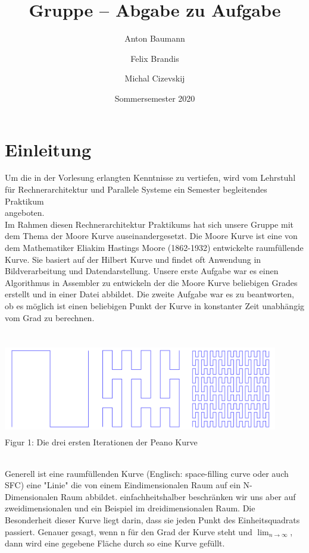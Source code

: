 \documentclass[course=erap]{aspdoc}
\author{Anton Baumann \and Felix Brandis \and Michal Cizevskij}
\date{Sommersemester 2020} %
\title{Gruppe \theGroup{} -- Abgabe zu Aufgabe \theNumber}
\begin{document}
\maketitle

\section{Einleitung}

Um die in der Vorlesung erlangten Kenntnisse zu vertiefen, wird vom Lehrstuhl für Rechnerarchitektur und Parallele Systeme ein Semester begleitendes Praktikum \\angeboten.\\
Im Rahmen diesen Rechnerarchitektur Praktikums hat sich unsere Gruppe mit dem Thema der Moore Kurve auseinandergesetzt. Die Moore Kurve ist eine von dem Mathematiker Eliakim Hastings Moore (1862-1932) entwickelte raumfüllende Kurve. Sie basiert auf der Hilbert Kurve und findet oft Anwendung in Bildverarbeitung und Datendarstellung. Unsere erste Aufgabe war es einen Algorithmus in Assembler zu entwickeln der die Moore Kurve beliebigen Grades erstellt und in einer Datei abbildet. Die zweite Aufgabe war es zu beantworten, ob es möglich ist einen beliebigen Punkt der Kurve in konstanter Zeit unabhängig vom Grad zu berechnen.\\
\\
\begin{center}
	\includegraphics[width=12cm, height=4cm]{Peano}\\ %
	\tiny Figur 1: Die drei ersten Iterationen der Peano Kurve
\end{center}
\	\\
Generell ist eine raumfüllenden Kurve (Englisch: space-filling curve oder auch SFC) eine "Linie" die von einem Eindimensionalen Raum auf ein N-Dimensionalen Raum abbildet. einfachheitshalber beschränken wir uns aber auf zweidimensionalen und ein Beispiel im dreidimensionalen Raum. Die Besonderheit dieser Kurve liegt darin, dass sie jeden Punkt des Einheitsquadrats passiert. Genauer gesagt, wenn n für den Grad der Kurve steht und $\lim_{n\to\infty}$, dann wird eine gegebene Fläche durch so eine Kurve gefüllt.\\
\end{document}
